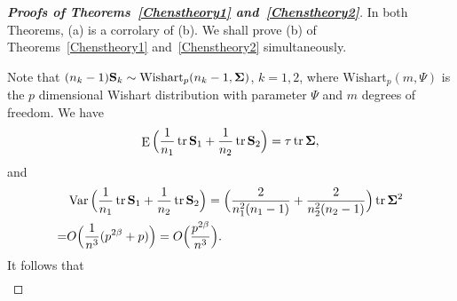 \documentclass[review]{elsarticle}
\DeclareMathOperator{\mytr}{tr}
\DeclareMathOperator{\myE}{E}
\DeclareMathOperator{\myVar}{Var}
\theoremstyle{plain}
\theoremstyle{definition}
\theoremstyle{remark}
\begin{document}
\begin{appendices}
\begin{proof}[\textbf{Proofs of Theorems~\ref{Chenstheory1} and~\ref{Chenstheory2}}]
    In both Theorems, (a) is a corrolary of (b).
    We shall prove (b) of Theorems~\ref{Chenstheory1} and~\ref{Chenstheory2} simultaneously.
    
    Note that $(n_k-1)\BS_k\sim \text{Wishart}_p(n_k-1,\bSigma)$, $k=1,2$,
    where $\text{Wishart}_p(m,\Psi)$ is the $p$ dimensional Wishart distribution with parameter $\Psi$ and $m$ degrees of freedom.
    We have %
%
    $$
 \myE\Big(\frac{1}{n_1}\mytr \BS_1+\frac{1}{n_2}\mytr \BS_2\Big)=\tau \mytr\bSigma,
    $$
    and
    $$
    \begin{aligned}
        &\myVar\Big(\frac{1}{n_1}\mytr \BS_1+\frac{1}{n_2}\mytr \BS_2\Big)=
        \Big(\frac{2}{n_1^2(n_1-1)}+\frac{2}{n_2^2(n_2-1)}\Big)\mytr \bSigma^2\\
        =&
    O\Big(\frac{1}{n^3}(p^{2\beta}+p)\Big)=O\Big(\frac{p^{2\beta}}{n^3}\Big).
    \end{aligned}
    $$
    It follows that
    $$
    \begin{aligned}

\end{aligned}$$
\end{proof}
\end{appendices}
\end{document}
